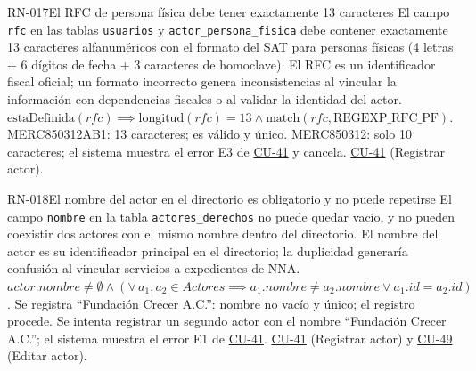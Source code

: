 \begin{BussinesRule}[%
	\brClassification{\btDerivation}{\bcIntegrity}{\blStrict}%
	]{RN-017}{El RFC de persona física debe tener exactamente 13 caracteres}
	\BRitem[Descripción:] El campo \texttt{rfc} en las tablas \texttt{usuarios} y \texttt{actor\_persona\_fisica} debe contener exactamente 13 caracteres alfanuméricos con el formato del SAT para personas físicas (4 letras + 6 dígitos de fecha + 3 caracteres de homoclave).
	\BRitem[Motivación:] El RFC es un identificador fiscal oficial; un formato incorrecto genera inconsistencias al vincular la información con dependencias fiscales o al validar la identidad del actor.
	\BRitem[Sentencia:] $\text{estaDefinida}(rfc) \implies \text{longitud}(rfc) = 13 \land \text{match}(rfc, \text{REGEXP\_RFC\_PF})$.
	 MERC850312AB1: 13 caracteres; es válido y único.
	 MERC850312: solo 10 caracteres; el sistema muestra el error E3 de \hyperlink{CU-41}{CU-41} y cancela.
	 \hyperlink{CU-41}{CU-41} (Registrar actor).
\end{BussinesRule}



\begin{BussinesRule}[%
	\brClassification{\btEnabler}{\bcCondition}{\blStrict}%
	]{RN-018}{El nombre del actor en el directorio es obligatorio y no puede repetirse}
	\BRitem[Descripción:] El campo \texttt{nombre} en la tabla \texttt{actores\_derechos} no puede quedar vacío, y no pueden coexistir dos actores con el mismo nombre dentro del directorio.
	\BRitem[Motivación:] El nombre del actor es su identificador principal en el directorio; la duplicidad generaría confusión al vincular servicios a expedientes de NNA.
	\BRitem[Sentencia:] $actor.nombre \neq \emptyset \land (\forall \, a_1, a_2 \in Actores \implies a_1.nombre \neq a_2.nombre \lor a_1.id = a_2.id)$.
	 Se registra ``Fundación Crecer A.C.'': nombre no vacío y único; el registro procede.
	 Se intenta registrar un segundo actor con el nombre ``Fundación Crecer A.C.''; el sistema muestra el error E1 de \hyperlink{CU-41}{CU-41}.
	 \hyperlink{CU-41}{CU-41} (Registrar actor) y \hyperlink{CU-49}{CU-49} (Editar actor).
\end{BussinesRule}

